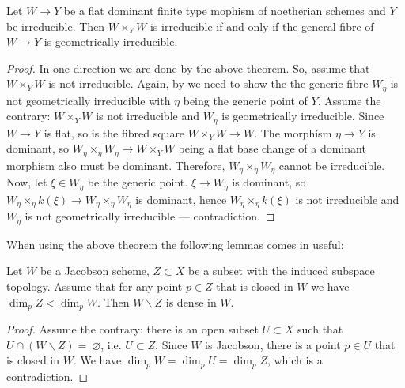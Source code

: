 \begin{corollary}\label{cor:fibre_criterion}
    Let $W \to Y$ be a flat dominant finite type mophism of noetherian schemes and $Y$ be irreducible. Then $W \times_Y W$ is irreducible if and only if the general fibre of $W \to Y$ is geometrically irreducible.
\end{corollary}
\begin{proof}
    In one direction we are done by the above theorem. So, assume that $W \times_Y W$ is not irreducible. Again, by \cite[IV.3, 9.7.8]{EGA} we need to show the the generic fibre $W_\eta$ is not geometrically irreducible with $\eta$ being the generic point of $Y$. Assume the contrary: $W \times_Y W$ is not irreducible and $W_\eta$ is geometrically irreducible. Since $W \to Y$ is flat, so is the fibred square $W \times_Y W \to W$. The morphism $\eta \to Y$ is dominant, so $W_\eta \times_\eta W_\eta \to W \times_Y W$ being a flat base change of a dominant morphism also must be dominant. Therefore, $W_\eta \times_\eta W_\eta$ cannot be irreducible. Now, let $\xi \in W_\eta$ be the generic point. $\xi \to W_\eta$ is dominant, so $W_\eta \times_\eta k(\xi) \to W_\eta \times_\eta W_\eta$ is dominant, hence $W_\eta \times_\eta k(\xi)$ is not irreducible and $W_\eta$ is not geometrically irreducible --- contradiction.
\end{proof}

When using the above theorem the following lemmas comes in useful:
\begin{lemma}
    Let $W$ be a Jacobson scheme, $Z \subset X$ be a subset with the induced subspace topology. Assume that for any point $p \in Z$ that is closed in $W$ we have $\dim_p Z < \dim_p W$. Then $W \backslash Z$ is dense in $W$.
\end{lemma}
\begin{proof}
    Assume the contrary: there is an open subset $U \subset X$ such that $U \cap (W \backslash Z) = ~\varnothing$, i.e. $U \subset Z$. Since $W$ is Jacobson, there is a point $p \in U$ that is closed in $W$. We have $\dim_p W = \dim_p U = \dim_p Z$, which is a contradiction.
\end{proof}

